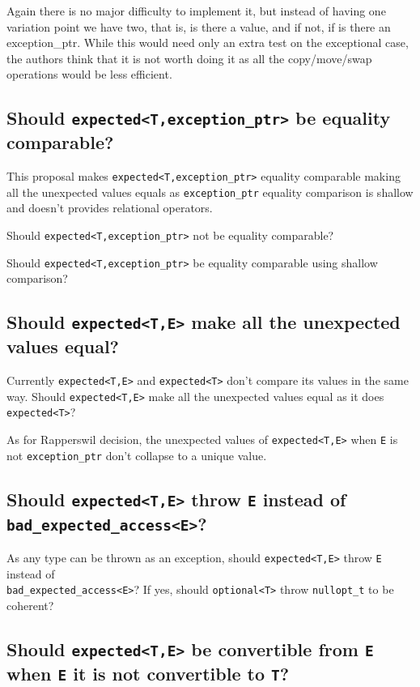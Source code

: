 \documentclass[a4paper,10pt]{article}
\newcommand{\cpp}[1]{\lstinline{#1}}
\begin{document}
Again there is no major difficulty to implement it, but instead of having one variation point we have two, that is, is there a value, and if not, if is there an exception_ptr. While this would need only an extra test on the exceptional case, the authors think that it is not worth doing it as all the copy/move/swap operations would be less efficient. 

\subsection{Should \cpp{expected<T,exception_ptr>} be equality comparable?}

This proposal makes \cpp{expected<T,exception_ptr>} equality comparable making all the unexpected values equals as \cpp{exception_ptr} equality comparison is shallow and doesn't provides relational operators.

Should \cpp{expected<T,exception_ptr>} not be equality comparable?

Should \cpp{expected<T,exception_ptr>} be equality comparable using shallow comparison?

\subsection{Should \cpp{expected<T,E>} make all the unexpected values equal?}

Currently \cpp{expected<T,E>} and \cpp{expected<T>} don't compare its values in the same way.
Should \cpp{expected<T,E>} make all the unexpected values equal as it does \cpp{expected<T>}?

As for Rapperswil decision, the unexpected values of \cpp{expected<T,E>} when \cpp{E} is not \cpp{exception_ptr} don't collapse to a unique value.

\subsection{Should \cpp{expected<T,E>} throw \cpp{E} instead of \cpp{bad_expected_access<E>}?}

As any type can be thrown as an exception, should \cpp{expected<T,E>} throw \cpp{E} instead of \\
\cpp{bad_expected_access<E>}? 
If yes, should \cpp{optional<T>} throw \cpp{nullopt_t} to be coherent? 

\subsection{Should \cpp{expected<T,E>} be convertible from \cpp{E} when \cpp{E} it is not convertible to \cpp{T}?}
\end{document}
